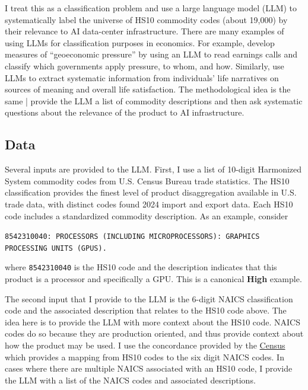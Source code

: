 \documentclass[12pt,pdftex]{article}
\newenvironment{prompt}{\par\medskip\noindent}{\par\medskip}
\begin{document}
\begin{onehalfspacing}
I treat this as a classification problem and use a large language model (LLM) to systematically label the universe of HS10 commodity codes (about 19,000) by their relevance to AI data-center infrastructure. There are many examples of using LLMs for classification purposes in economics. For example, \citet{clayton2025geoeconomic} develop measures of ``geoeconomic pressure'' by using an LLM to read earnings calls and classify which governments apply pressure, to whom, and how. Similarly, \citet{lagakos2025american} use LLMs to extract systematic information from individuals' life narratives on sources of meaning and overall life satisfaction. The methodological idea is the same | provide the LLM a list of commodity descriptions and then ask systematic questions about the relevance of the product to AI infrastructure.

\subsection{Data}

Several inputs are provided to the LLM. First, I use a list of 10-digit Harmonized System commodity codes from U.S. Census Bureau trade statistics. The HS10 classification provides the finest level of product disaggregation available in U.S. trade data, with \totalTradeHsCodes{} distinct codes found 2024 import and export data. Each HS10 code includes a standardized commodity description. As an example, consider
\begin{prompt}
\noindent\texttt{8542310040: PROCESSORS (INCLUDING MICROPROCESSORS): GRAPHICS PROCESSING UNITS (GPUS).}
\end{prompt}
where \texttt{8542310040} is the HS10 code and the description indicates that this product is a processor and specifically a GPU. This is a canonical \textbf{High} example. 

The second input that I provide to the LLM is the 6-digit NAICS classification code and the associated description that relates to the HS10 code above. The idea here is to provide the LLM with more context about the HS10 code. NAICS codes do so because they are production oriented, and thus provide context about how the product may be used. I use the concordance provided by the \href{https://www.census.gov/foreign-trade/schedules/b/2022/imp-code.txt}{Census} which provides a mapping from HS10 codes to the six digit NAICS codes. In cases where there are multiple NAICS associated with an HS10 code, I provide the LLM with a list of the NAICS codes and associated descriptions. 


\end{onehalfspacing}
\end{document}
